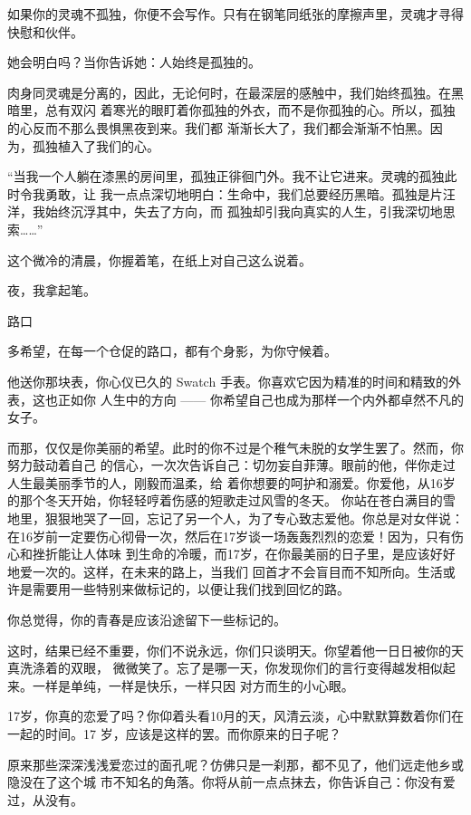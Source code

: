 \documentclass[12pt,a4paper]{article}
\def\blankrev{\vspace{1ex}}									%
\newcommand{\subpart}[1]{
	\begingroup \par
	\vspace{1ex} \centering #1
	\par \endgroup
}
\begin{document}
		如果你的灵魂不孤独，你便不会写作。只有在钢笔同纸张的摩擦声里，灵魂才寻得快慰和伙伴。

		她会明白吗？当你告诉她：人始终是孤独的。

		肉身同灵魂是分离的，因此，无论何时，在最深层的感触中，我们始终孤独。在黑暗里，总有双闪
	着寒光的眼盯着你孤独的外衣，而不是你孤独的心。所以，孤独的心反而不那么畏惧黑夜到来。我们都
	渐渐长大了，我们都会渐渐不怕黑。因为，孤独植入了我们的心。

		“当我一个人躺在漆黑的房间里，孤独正徘徊门外。我不让它进来。灵魂的孤独此时令我勇敢，让
	我一点点深切地明白：生命中，我们总要经历黑暗。孤独是片汪洋，我始终沉浮其中，失去了方向，而
	孤独却引我向真实的人生，引我深切地思索……”

		这个微冷的清晨，你握着笔，在纸上对自己这么说着。

	\endwriting



		夜，我拿起笔。

		\subpart{路口}
		多希望，在每一个仓促的路口，都有个身影，为你守候着。

		\blankrev
		他送你那块表，你心仪已久的 Swatch 手表。你喜欢它因为精准的时间和精致的外表，这也正如你
	人生中的方向 —— 你希望自己也成为那样一个内外都卓然不凡的女子。

		而那，仅仅是你美丽的希望。此时的你不过是个稚气未脱的女学生罢了。然而，你努力鼓动着自己
	的信心，一次次告诉自己：切勿妄自菲薄。眼前的他，伴你走过人生最美丽季节的人，刚毅而温柔，给
	着你想要的呵护和溺爱。你爱他，从16岁的那个冬天开始，你轻轻哼着伤感的短歌走过风雪的冬天。
	你站在苍白满目的雪地里，狠狠地哭了一回，忘记了另一个人，为了专心致志爱他。你总是对女伴说：
	在16岁前一定要伤心彻骨一次，然后在17岁谈一场轰轰烈烈的恋爱！因为，只有伤心和挫折能让人体味
	到生命的冷暖，而17岁，在你最美丽的日子里，是应该好好地爱一次的。这样，在未来的路上，当我们
	回首才不会盲目而不知所向。生活或许是需要用一些特别来做标记的，以便让我们找到回忆的路。

		你总觉得，你的青春是应该沿途留下一些标记的。

		这时，结果已经不重要，你们不说永远，你们只谈明天。你望着他一日日被你的天真洗涤着的双眼，
	微微笑了。忘了是哪一天，你发现你们的言行变得越发相似起来。一样是单纯，一样是快乐，一样只因
	对方而生的小心眼。

		17岁，你真的恋爱了吗？你仰着头看10月的天，风清云淡，心中默默算数着你们在一起的时间。17
	岁，应该是这样的罢。而你原来的日子呢？

		原来那些深深浅浅爱恋过的面孔呢？仿佛只是一刹那，都不见了，他们远走他乡或隐没在了这个城
	市不知名的角落。你将从前一点点抹去，你告诉自己：你没有爱过，从没有。
\end{document}
